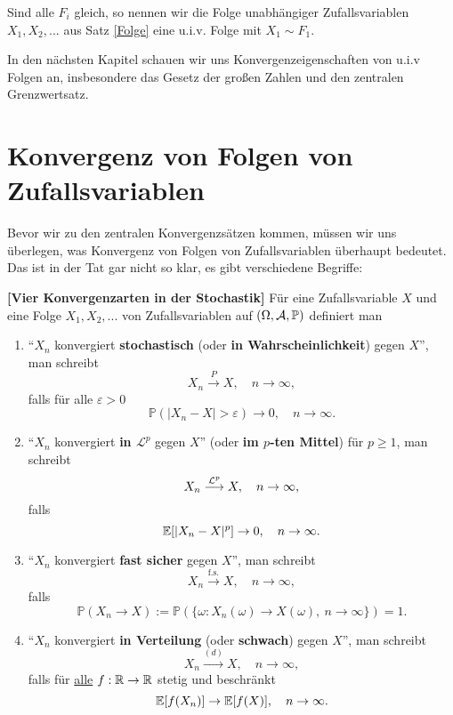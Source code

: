 \begin{deff}
	Sind alle $F_i$ gleich, so nennen wir die Folge unabh\"angiger Zufallsvariablen $X_1,X_2,...$ aus Satz \ref{Folge} eine u.i.v. Folge mit $X_1 \sim F_1$.
\end{deff}
In den n\"achsten Kapitel schauen wir uns Konvergenzeigenschaften von u.i.v Folgen an, insbesondere das Gesetz der gro\ss en Zahlen und den zentralen Grenzwertsatz.

\section{Konvergenz von Folgen von Zufallsvariablen}
Bevor wir zu den zentralen Konvergenzs\"atzen kommen, m\"ussen wir uns \"uberlegen, was Konvergenz von Folgen von Zufallsvariablen \"uberhaupt bedeutet. Das ist in der Tat gar nicht so klar, es gibt verschiedene Begriffe:
\begin{deff}
 \textbf{[Vier Konvergenzarten in der Stochastik]}
	Für eine Zufallsvariable $X$ und eine Folge $X_1,X_2,...$ von Zufallsvariablen auf $(\Omega, \mathcal{A}, \mathbb{P})$  definiert man
	\begin{enumerate}[label=(\roman*)]
		\item \enquote{$X_n$ konvergiert \textbf{stochastisch} (oder \textbf{in Wahrscheinlichkeit}) gegen $X$}, man schreibt		
		$$X_n \overset{P}{\longrightarrow} X, \quad n \to \infty,$$ falls f\"ur alle $\varepsilon>0$ $$\mathbb{P}(|X_n-X|>\varepsilon) \to 0, \quad n \to \infty.$$
		\item \enquote{$X_n$ konvergiert \textbf{in $\mathcal L^p$} gegen $X$} (oder \textbf{im $p$-ten Mittel}) f\"ur $p\geq 1$, man schreibt
		$$X_n \overset{\mathcal{L}^p}{\longrightarrow} X, \quad n \to \infty,$$ falls $$\mathbb{E}[|X_n - X|^p] \to 0, \quad n \to \infty.$$
		\item 
		\enquote{$X_n$ konvergiert \textbf{fast sicher} gegen $X$}, man schreibt
		$$X_n \overset{\text{f.s.}}{\longrightarrow} X, \quad n \to \infty,$$ falls $$\mathbb{P}(X_n \to X) := \mathbb{P}(\{ \omega\colon X_n(\omega) \to X(\omega), \: n\to \infty \}) = 1.$$
		\item 
		 \enquote{$X_n$ konvergiert  \textbf{in Verteilung} (oder \textbf{schwach}) gegen $X$}, man schreibt		
		$$X_n \overset{(d)}{\longrightarrow} X, \quad n \to \infty,$$ falls f\"ur \underline{alle} $f:\mathbb{R}\to\mathbb{R}$ stetig und beschr\"ankt
		$$\mathbb{E}[f(X_n)] \to \mathbb{E}[f(X)], \quad n\to\infty.$$
	\end{enumerate}
\end{deff}
